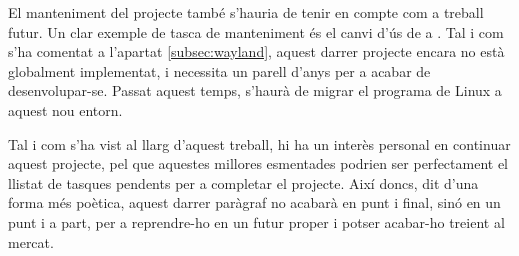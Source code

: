 El manteniment del projecte també s'hauria de tenir en compte com a treball
futur. Un clar exemple de tasca de manteniment és el canvi d'ús de 
a . Tal i com s'ha comentat a l'apartat \ref{subsec:wayland},
aquest darrer projecte encara no està globalment implementat, i necessita un
parell d'anys per a acabar de desenvolupar-se. Passat aquest temps, s'haurà
de migrar el programa de Linux a aquest nou entorn.

Tal i com s'ha vist al llarg d'aquest treball, hi ha un interès personal en
continuar aquest projecte, pel que aquestes millores esmentades podrien ser
perfectament el llistat de tasques pendents per a completar el projecte.
Així doncs, dit d'una forma més poètica, aquest darrer paràgraf no acabarà en
punt i final, sinó en un punt i a part, per a reprendre-ho en un futur proper
i potser acabar-ho treient al mercat.
